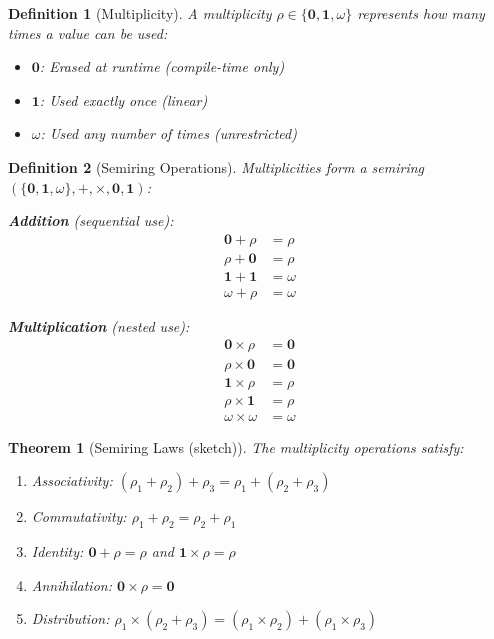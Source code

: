 \documentclass[11pt]{article}
\newtheorem{definition}{Definition}
\newtheorem{theorem}{Theorem}
\newcommand{\mult}{\rho}
\newcommand{\zero}{\mathbf{0}}
\newcommand{\one}{\mathbf{1}}
\newcommand{\many}{\omega}
\begin{document}
\begin{definition}[Multiplicity]
A multiplicity $\mult \in \{\zero, \one, \many\}$ represents how many times
a value can be used:
\begin{itemize}
\item $\zero$: Erased at runtime (compile-time only)
\item $\one$: Used exactly once (linear)
\item $\many$: Used any number of times (unrestricted)
\end{itemize}
\end{definition}

\begin{definition}[Semiring Operations]
Multiplicities form a semiring $(\{\zero, \one, \many\}, +, \times, \zero, \one)$:

\textbf{Addition} (sequential use):
\begin{align*}
\zero + \mult &= \mult \\
\mult + \zero &= \mult \\
\one + \one &= \many \\
\many + \mult &= \many
\end{align*}

\textbf{Multiplication} (nested use):
\begin{align*}
\zero \times \mult &= \zero \\
\mult \times \zero &= \zero \\
\one \times \mult &= \mult \\
\mult \times \one &= \mult \\
\many \times \many &= \many
\end{align*}
\end{definition}

\begin{theorem}[Semiring Laws (sketch)]
The multiplicity operations satisfy:
\begin{enumerate}
\item Associativity: $(\mult_1 + \mult_2) + \mult_3 = \mult_1 + (\mult_2 + \mult_3)$
\item Commutativity: $\mult_1 + \mult_2 = \mult_2 + \mult_1$
\item Identity: $\zero + \mult = \mult$ and $\one \times \mult = \mult$
\item Annihilation: $\zero \times \mult = \zero$
\item Distribution: $\mult_1 \times (\mult_2 + \mult_3) =
      (\mult_1 \times \mult_2) + (\mult_1 \times \mult_3)$
\end{enumerate}
\end{theorem}
\end{document}
